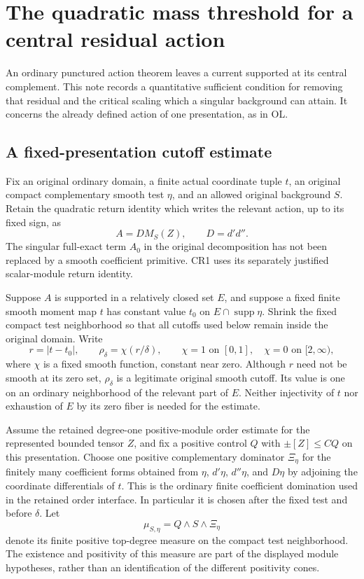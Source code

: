 \section{The quadratic mass threshold for a central residual action}
\label{sec:r13-point-residual-mass-threshold}

An ordinary punctured action theorem leaves a current supported
at its central complement.  This note records a quantitative
sufficient condition for removing that residual and the critical
scaling which a singular background can attain.  It concerns the
already defined action of one presentation, as in OL.

\subsection{A fixed-presentation cutoff estimate}

Fix an original ordinary domain, a finite actual coordinate tuple
\(t\), an original compact complementary smooth test \(\eta\),
and an allowed original background \(S\).  Retain the quadratic
return identity which writes the relevant action, up to its fixed
sign, as
\[
                  A=D M_S(Z),\qquad D=d'd''.
\tag{CR1}
\]
The singular full-exact term \(A_0\) in the original decomposition
has not been replaced by a smooth coefficient primitive.  CR1
uses its separately justified scalar-module return identity.

Suppose \(A\) is supported in a relatively closed set \(E\), and
suppose a fixed finite smooth moment map \(t\) has constant value
\(t_0\) on \(E\cap\operatorname{supp}\eta\).  Shrink the fixed
compact test neighborhood so that all cutoffs used below remain
inside the original domain.  Write
\[
 r=|t-t_0|,\qquad
 \rho_\delta=\chi(r/\delta),\qquad
 \chi=1\text{ on }[0,1],\quad \chi=0\text{ on }[2,\infty),
\tag{CR2}
\]
where \(\chi\) is a fixed smooth function, constant near zero.
Although \(r\) need not be smooth at its zero set, \(\rho_\delta\)
is a legitimate original smooth cutoff.  Its value is one on
an ordinary neighborhood of the relevant part of \(E\).
Neither injectivity of \(t\) nor exhaustion of \(E\) by its
zero fiber is needed for the estimate.

Assume the retained degree-one positive-module order estimate
for the represented bounded tensor \(Z\), and fix a positive
control \(Q\) with \(\pm[Z]\le C Q\) on this presentation.
Choose one positive complementary dominator \(\Xi_\eta\) for
the finitely many coefficient forms obtained from \(\eta\),
\(d'\eta\), \(d''\eta\), and \(D\eta\) by adjoining the
coordinate differentials of \(t\).  This is the ordinary finite
coefficient domination used in the retained order interface.
In particular it is chosen after the fixed test and before
\(\delta\).  Let
\[
                    \mu_{S,\eta}=Q\wedge S\wedge\Xi_\eta
\tag{CR3}
\]
denote its finite positive top-degree measure on the compact
test neighborhood.  The existence and positivity of this
measure are part of the displayed module hypotheses, rather
than an identification of the different positivity cones.

